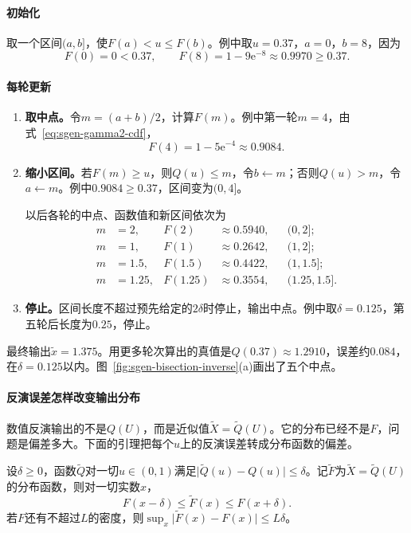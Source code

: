\paragraph{初始化}
取一个区间$(a,b]$，使$F(a)<u\le F(b)$。例中取$u=0.37$，$a=0$，$b=8$，因为
\[
  F(0)=0<0.37,\qquad F(8)=1-9\mathrm{e}^{-8}\approx0.9970\ge0.37 .
\]

\paragraph{每轮更新}
\begin{enumerate}
  \item \textbf{取中点。}令$m=(a+b)/2$，计算$F(m)$。例中第一轮$m=4$，由式~\eqref{eq:sgen-gamma2-cdf}，
  \[
    F(4)=1-5\mathrm{e}^{-4}\approx0.9084 .
  \]
  \item \textbf{缩小区间。}若$F(m)\ge u$，则$Q(u)\le m$，令$b\leftarrow m$；否则$Q(u)>m$，令$a\leftarrow m$。例中$0.9084\ge0.37$，区间变为$(0,4]$。

  以后各轮的中点、函数值和新区间依次为
  \[
    \begin{aligned}
      m&=2,& F(2)&\approx0.5940,& &(0,2];\\
      m&=1,& F(1)&\approx0.2642,& &(1,2];\\
      m&=1.5,& F(1.5)&\approx0.4422,& &(1,1.5];\\
      m&=1.25,& F(1.25)&\approx0.3554,& &(1.25,1.5].
    \end{aligned}
  \]
  \item \textbf{停止。}区间长度不超过预先给定的$2\delta$时停止，输出中点。例中取$\delta=0.125$，第五轮后长度为$0.25$，停止。
\end{enumerate}
最终输出$\widetilde{x}=1.375$。用更多轮次算出的真值是$Q(0.37)\approx1.2910$，误差约$0.084$，在$\delta=0.125$以内。图~\ref{fig:sgen-bisection-inverse}(a)画出了五个中点。

\paragraph{反演误差怎样改变输出分布}
数值反演输出的不是$Q(U)$，而是近似值$\widetilde{X}=\widetilde{Q}(U)$。它的分布已经不是$F$，问题是偏差多大。下面的引理把每个$u$上的反演误差转成分布函数的偏差。

\begin{lemma}[反演误差的传递]
\label{lem:sgen-inversion-error}
设$\delta\ge0$，函数$\widetilde{Q}$对一切$u\in(0,1)$满足$\lvert\widetilde{Q}(u)-Q(u)\rvert\le\delta$。记$\widetilde{F}$为$\widetilde{X}=\widetilde{Q}(U)$的分布函数，则对一切实数$x$，
\begin{equation}
  F(x-\delta)\le\widetilde{F}(x)\le F(x+\delta).
  \label{eq:sgen-inversion-band}
\end{equation}
若$F$还有不超过$L$的密度，则$\sup_x\lvert\widetilde{F}(x)-F(x)\rvert\le L\delta$。
\end{lemma}

